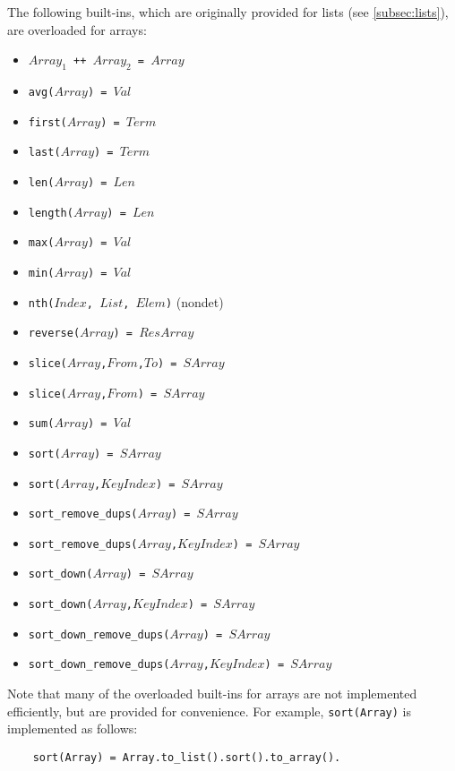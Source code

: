 The following built-ins, which are originally provided for lists (see \ref{subsec:lists}), are overloaded for arrays:
\begin{itemize}
\item \texttt{$Array_1$ ++ $Array_2$ = $Array$}
\item \texttt{avg($Array$) = $Val$}
\item \texttt{first($Array$) = $Term$}
\item \texttt{last($Array$) = $Term$}
\item \texttt{len($Array$) = $Len$}
\item \texttt{length($Array$) = $Len$}
\item \texttt{max($Array$) = $Val$}
\item \texttt{min($Array$) = $Val$}
\item \texttt{nth($Index$, $List$, $Elem$)} (nondet)
\item \texttt{reverse($Array$) = $ResArray$}
\item \texttt{slice($Array$,$From$,$To$) = $SArray$}
\item \texttt{slice($Array$,$From$) = $SArray$}
\item \texttt{sum($Array$) = $Val$}
\item \texttt{sort($Array$) = $SArray$}
\item \texttt{sort($Array$,$KeyIndex$) = $SArray$}
\item \texttt{sort\_remove\_dups($Array$) = $SArray$}
\item \texttt{sort\_remove\_dups($Array$,$KeyIndex$) = $SArray$}
\item \texttt{sort\_down($Array$) = $SArray$}
\item \texttt{sort\_down($Array$,$KeyIndex$) = $SArray$}
\item \texttt{sort\_down\_remove\_dups($Array$) = $SArray$}
\item \texttt{sort\_down\_remove\_dups($Array$,$KeyIndex$) = $SArray$}
\end{itemize}
Note that many of the overloaded built-ins for arrays are not implemented efficiently, but are provided for convenience. For example, \texttt{sort(Array)} is implemented as follows:
\begin{verbatim}
    sort(Array) = Array.to_list().sort().to_array().
\end{verbatim}

